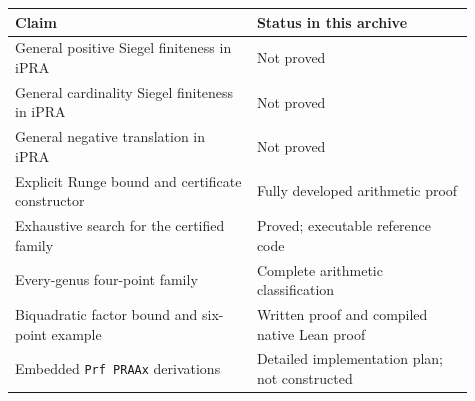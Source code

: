 \begin{center}
\begin{tabular}{@{}p{0.48\linewidth}p{0.43\linewidth}@{}}
\toprule
Claim & Status in this archive\\
\midrule
General positive Siegel finiteness in iPRA & Not proved\\
General cardinality Siegel finiteness in iPRA & Not proved\\
General negative translation in iPRA & Not proved\\
Explicit Runge bound and certificate constructor & Fully developed arithmetic proof\\
Exhaustive search for the certified family & Proved; executable reference code\\
Every-genus four-point family & Complete arithmetic classification\\
Biquadratic factor bound and six-point example & Written proof and compiled native Lean proof\\
Embedded \texttt{Prf PRAAx} derivations & Detailed implementation plan; not constructed\\
\bottomrule
\end{tabular}
\end{center}
